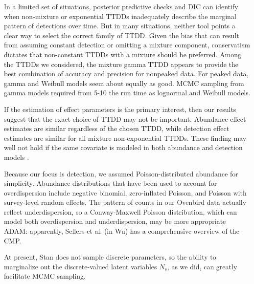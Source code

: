 \documentclass[useAMS,usenatbib,referee,12pt]{article}
\newcommand{\adam}[1]{{\color{blue} ADAM: #1}}
\begin{document}
In a limited set of situations, posterior predictive checks and DIC can identify when non-mixture or exponential TTDDs inadequately describe the marginal pattern of detections over time.  
But in many situations, neither tool points a clear way to select the correct family of TTDD.  
Given the bias that can result from assuming constant detection or omitting a mixture component, conservatism dictates that non-constant TTDDs with a mixture should be preferred.  
Among the TTDDs we considered, the mixture gamma TTDD appears to provide the best combination of accuracy and precision for nonpeaked data.  
For peaked data, gamma and Weibull models seem about equally as good.  
MCMC sampling from gamma models required from 5-10 the run time as lognormal and Weibull models.

If the estimation of effect parameters is the primary interest, then our results suggest that the exact choice of TTDD may not be important.  
Abundance effect estimates are similar regardless of the chosen TTDD, while detection effect estimates are similar for all mixture non-exponential TTDDs.  
These finding may well not hold if the same covariate is modeled in both abundance and detection models \citep{Kery2008}.

Because our focus is detection, we assumed Poisson-distributed abundance for simplicity.  
Abundance distributions that have been used to account for overdispersion include negative binomial, zero-inflated Poisson, and Poisson with survey-level random effects.  
The pattern of counts in our Ovenbird data actually reflect underdispersion, so a Conway-Maxwell Poisson distribution, which can model both overdispersion and underdispersion, may be more appropriate \citep{Wu2015}\adam{apparently, Sellers et al. (in Wu) has a comprehensive overview of the CMP.}



At present, Stan does not sample discrete parameters, so the ability to marginalize out the discrete-valued latent variables $N_{s}$, as we did, can greatly facilitate MCMC sampling.


\end{document}
